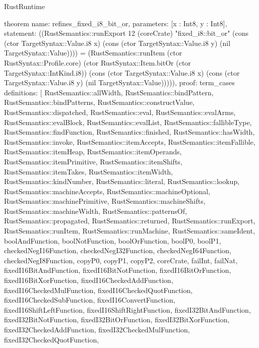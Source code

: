\begin{lexlean}{RustRuntime}
\begin{semanticmodule}
theorem{
  name: refines_fixed_i8_bit_or,
  parameters: [x : Int8, y : Int8],
  statement: ((RustSemantics::runExport 12 (coreCrate) "fixed_i8::bit_or" (cons (ctor TargetSyntax::Value.i8 x) (cons (ctor TargetSyntax::Value.i8 y) (nil TargetSyntax::Value)))) = (RustSemantics::runItem (ctor RustSyntax::Profile.core) (ctor RustSyntax::Item.bitOr (ctor TargetSyntax::IntKind.i8)) (cons (ctor TargetSyntax::Value.i8 x) (cons (ctor TargetSyntax::Value.i8 y) (nil TargetSyntax::Value))))),
  proof: term_cases{
    definitions: [
      RustSemantics::allWidth,
      RustSemantics::bindPattern,
      RustSemantics::bindPatterns,
      RustSemantics::constructValue,
      RustSemantics::dispatched,
      RustSemantics::eval,
      RustSemantics::evalArms,
      RustSemantics::evalBlock,
      RustSemantics::evalList,
      RustSemantics::fallibleType,
      RustSemantics::findFunction,
      RustSemantics::finished,
      RustSemantics::hasWidth,
      RustSemantics::invoke,
      RustSemantics::itemAccepts,
      RustSemantics::itemFallible,
      RustSemantics::itemHeap,
      RustSemantics::itemOperands,
      RustSemantics::itemPrimitive,
      RustSemantics::itemShifts,
      RustSemantics::itemTakes,
      RustSemantics::itemWidth,
      RustSemantics::kindNumber,
      RustSemantics::literal,
      RustSemantics::lookup,
      RustSemantics::machineAccepts,
      RustSemantics::machineOptional,
      RustSemantics::machinePrimitive,
      RustSemantics::machineShifts,
      RustSemantics::machineWidth,
      RustSemantics::patternsOf,
      RustSemantics::propagated,
      RustSemantics::returned,
      RustSemantics::runExport,
      RustSemantics::runItem,
      RustSemantics::runMachine,
      RustSemantics::sameIdent,
      boolAndFunction,
      boolNotFunction,
      boolOrFunction,
      boolP0,
      boolP1,
      checkedNegI16Function,
      checkedNegI32Function,
      checkedNegI64Function,
      checkedNegI8Function,
      copyP0,
      copyP1,
      copyP2,
      coreCrate,
      failInt,
      failNat,
      fixedI16BitAndFunction,
      fixedI16BitNotFunction,
      fixedI16BitOrFunction,
      fixedI16BitXorFunction,
      fixedI16CheckedAddFunction,
      fixedI16CheckedMulFunction,
      fixedI16CheckedQuotFunction,
      fixedI16CheckedSubFunction,
      fixedI16ConvertFunction,
      fixedI16ShiftLeftFunction,
      fixedI16ShiftRightFunction,
      fixedI32BitAndFunction,
      fixedI32BitNotFunction,
      fixedI32BitOrFunction,
      fixedI32BitXorFunction,
      fixedI32CheckedAddFunction,
      fixedI32CheckedMulFunction,
      fixedI32CheckedQuotFunction,
}}
\end{semanticmodule}
\end{lexlean}
